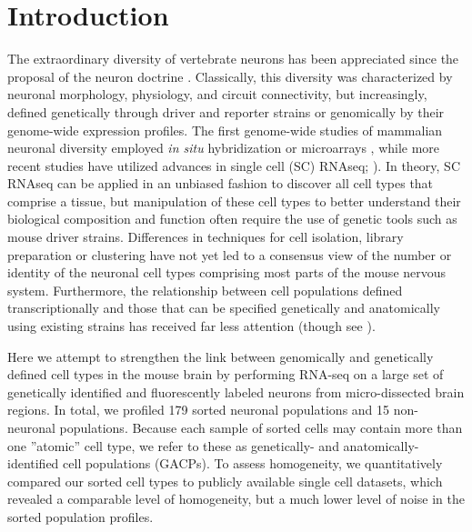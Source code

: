 \section*{Introduction}

The extraordinary diversity of vertebrate neurons has been appreciated since the proposal of the neuron doctrine \citep{Cajal_1888}. Classically, this diversity was characterized by neuronal morphology, physiology, and circuit connectivity, but increasingly, defined genetically through driver and reporter strains \cite{Gong_2003, Madisen_2009, Taniguchi_2011, Shima_2016} or genomically by their genome-wide expression profiles. The first genome-wide studies of mammalian neuronal diversity employed \textit{in situ} hybridization \citep{Lein_2006} or microarrays \cite{Sugino_2005, Doyle_2008}, while more recent studies have utilized advances in single cell (SC) RNAseq; \citealt{Zeisel_2015, Zeisel_2018, Tasic_2016, Tasic_2018, Paul_2017}). In theory, SC RNAseq can be applied in an unbiased fashion to discover all cell types that comprise a tissue, but manipulation of these cell types to better understand their biological composition and function often require the use of genetic tools such as mouse driver strains. Differences in techniques for cell isolation, library preparation or clustering have not yet led to a consensus view of the number or identity of the neuronal cell types comprising most parts of the mouse nervous system. Furthermore, the relationship between cell populations defined transcriptionally and those that can be specified genetically and anatomically using existing strains has received far less attention (though see \citealt{Tasic_2018}).    
 
Here we attempt to strengthen the link between genomically and genetically defined cell types in the mouse brain by performing RNA-seq on a large set of genetically identified and fluorescently labeled neurons from micro-dissected brain regions. In total, we profiled 179 sorted neuronal populations and 15 non-neuronal populations. Because each sample of sorted cells may contain more than one ”atomic” cell type, we refer to these as genetically- and anatomically-identified cell populations (GACPs). To assess homogeneity, we quantitatively compared our sorted cell types to publicly available single cell datasets, which revealed a comparable level of homogeneity, but a much lower level of noise in the sorted population profiles.

